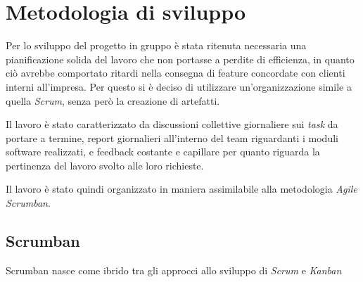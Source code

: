 \chapter{Metodologia di sviluppo}
\label{ch:metodologia}
Per lo sviluppo del progetto in gruppo è stata ritenuta necessaria una pianificazione solida del lavoro che non portasse a perdite di efficienza, in quanto ciò avrebbe comportato ritardi nella consegna di feature concordate con clienti interni all'impresa.
Per questo si è deciso di utilizzare un'organizzazione simile a quella \textit{Scrum}, senza però la creazione di artefatti.

Il lavoro è stato caratterizzato da discussioni collettive giornaliere sui \textit{task} da portare a termine, report giornalieri all'interno del team riguardanti i moduli software realizzati, e feedback costante e capillare per quanto riguarda la pertinenza del lavoro svolto alle loro richieste.

Il lavoro è stato quindi organizzato in maniera assimilabile alla metodologia \textit{Agile} \textit{Scrumban}.
\section{Scrumban}
Scrumban nasce come ibrido tra gli approcci allo sviluppo di \textit{Scrum} e \textit{Kanban}

